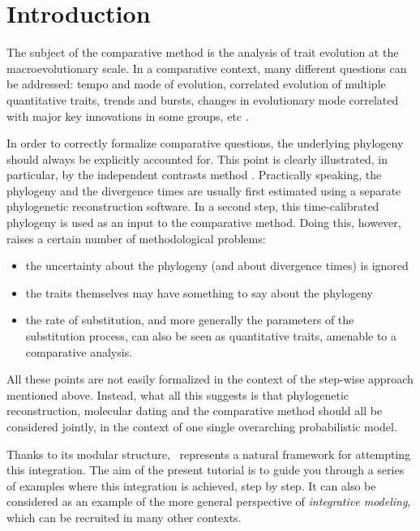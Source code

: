 \section{Introduction}

The subject of the comparative method is the analysis of trait evolution at the macroevolutionary scale.
In a comparative context, many different questions can be addressed: tempo and mode of evolution, correlated evolution of multiple quantitative traits, trends and bursts, changes in evolutionary mode correlated with major key innovations in some groups, etc \citep[for a good introduction see][]{Harvey1991}.

In order to correctly formalize comparative questions, the underlying phylogeny should always be explicitly accounted for. This point is clearly illustrated, in particular, by the independent contrasts method \citep{Felsenstein1985a,Huelsenbeck2003}. Practically speaking, the phylogeny and the divergence times are usually first estimated using a separate phylogenetic reconstruction software. In a second step, this time-calibrated phylogeny is used as an input to the comparative method.
Doing this, however, raises a certain number of methodological problems:
\begin{itemize}
\item
the uncertainty about the phylogeny (and about divergence times) is ignored
\item
the traits themselves may have something to say about the phylogeny
\item
the rate of substitution, and more generally the parameters of the substitution process, can also be seen as quantitative traits, amenable to a comparative analysis.
\end{itemize}
All these points are not easily formalized in the context of the step-wise approach mentioned above.
Instead, what all this suggests is that phylogenetic reconstruction, molecular dating and the comparative method should all be considered jointly, in the context of one single overarching probabilistic model.

Thanks to its modular structure, \RevBayes~represents a natural framework for attempting this integration.
The aim of the present tutorial is to guide you through a series of examples where this integration is achieved, step by step.
It can also be considered as an example of the more general perspective of \emph{integrative modeling}, which can be recruited in many other contexts.




